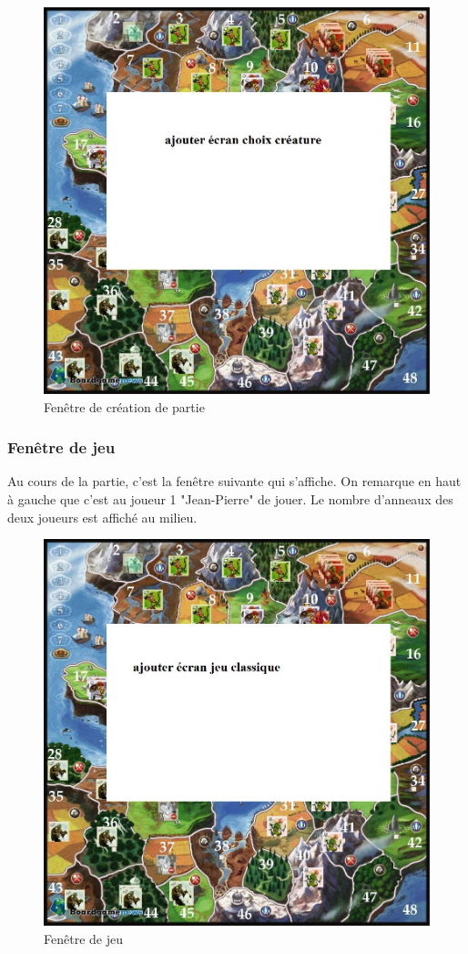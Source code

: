 \begin{figure}[ht!]
\centering
\includegraphics[scale=0.40]{img/crea.jpg}
\caption{Fenêtre de création de partie}
\end{figure}


\subsubsection{Fenêtre de jeu}
Au cours de la partie, c'est la fenêtre suivante qui s'affiche. On remarque en haut à gauche que c'est au joueur 1 "Jean-Pierre" de jouer. Le nombre d'anneaux des deux joueurs est affiché au milieu.

\begin{figure}[ht!]
\centering
\includegraphics[scale=0.40]{img/jeu.jpg}
\caption{Fenêtre de jeu}
\end{figure}

